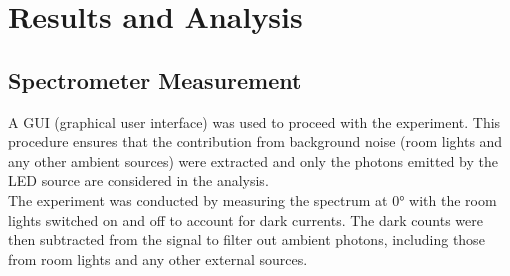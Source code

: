 \chapter{Results and Analysis}
    \section{Spectrometer Measurement}
    A GUI (graphical user interface) was used to proceed with the experiment. This procedure ensures that the contribution from background noise (room lights and any other ambient sources) were extracted and only the photons emitted by the LED source are considered in the analysis. \\
    
    The experiment was conducted by measuring the spectrum at 0° with the room lights switched on and off to account for dark currents. The dark counts were then subtracted from the signal to filter out ambient photons, including those from room lights and any other external sources.
    
